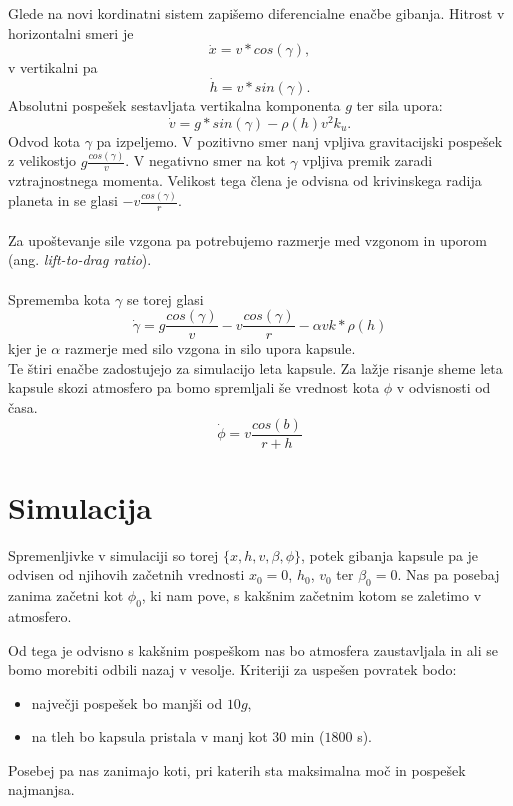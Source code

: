 \documentclass[11pt,a4paper]{article}
\begin{document}
Glede na novi kordinatni sistem zapi\v semo diferencialne ena\v cbe gibanja. Hitrost v horizontalni smeri je
\begin{equation}
	\dot{x} = v * cos(\gamma),
\end{equation}
v vertikalni pa
\begin{equation}
	\dot{h} = v * sin(\gamma).
\end{equation}
Absolutni pospe\v sek sestavljata vertikalna komponenta $g$ ter sila upora:
\begin{equation}
	\dot{v} = g*sin(\gamma) - \rho(h) v^2 k_u.
\end{equation}
Odvod kota $\gamma$ pa izpeljemo. V pozitivno smer nanj vpljiva gravitacijski pospe\v sek z velikostjo $g\frac{cos(\gamma)}{v}$. V negativno smer na kot $\gamma$ vpljiva premik zaradi vztrajnostnega momenta. Velikost tega \v clena je odvisna od krivinskega radija planeta in se glasi $ -v \frac{cos(\gamma)}{r}$.\\ \\
Za upo\v stevanje sile vzgona pa potrebujemo razmerje med vzgonom in uporom (ang. \textit{lift-to-drag ratio}). \\\\
Sprememba kota $\gamma$ se torej glasi
\begin{equation}
	\dot{\gamma} = g\frac{cos(\gamma)}{v}  - v \frac{cos(\gamma)}{r} - \alpha v k*\rho(h)
\end{equation}
kjer je $\alpha$ razmerje med silo vzgona in silo upora kapsule.\\

Te \v stiri ena\v cbe zadostujejo za simulacijo leta kapsule. Za la\v zje risanje sheme  leta kapsule skozi atmosfero pa bomo spremljali \v se vrednost kota $\phi$ v odvisnosti od \v casa.
\begin{equation}
	\dot{\phi} = v \frac{cos(b)}{r+h}
\end{equation}
\newpage

\section{Simulacija}
Spremenljivke v simulaciji so torej $\{x, h, v, \beta, \phi \}$, potek gibanja kapsule pa je odvisen od njihovih za\v cetnih vrednosti $x_0 = 0$, $h_0$, $v_0$ ter $\beta_0 = 0$. Nas pa posebaj zanima za\v cetni kot $\phi_0$, ki nam pove, s kak\v snim za\v cetnim kotom se zaletimo v atmosfero.

Od tega je odvisno s kak\v snim pospe\v skom nas bo atmosfera zaustavljala in ali se bomo morebiti odbili nazaj v vesolje. Kriteriji za uspe\v sen povratek bodo:
\begin{itemize}
	\item najve\v cji pospe\v sek bo manj\v si od $10 g$,
	\item na tleh bo kapsula pristala v manj kot $30$ min ($1800$ s).
\end{itemize}
Posebej pa nas zanimajo koti, pri katerih sta maksimalna mo\v c in pospe\v sek najmanjsa. \\
\end{document}
